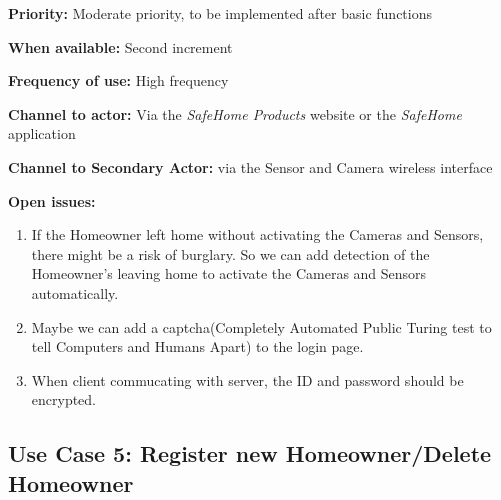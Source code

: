 \documentclass[twoside,11pt]{article}
\begin{document}
\begin{center}
{{\begin{multicols}{2}
                \textbf{Priority:} Moderate priority, to be implemented after basic functions

                \textbf{When available:} Second increment

                \textbf{Frequency of use:} High frequency

                \textbf{Channel to actor:} Via the \emph{SafeHome Products} website or the \emph{SafeHome} application

                \textbf{Channel to Secondary Actor:} via the Sensor and Camera wireless interface

                \textbf{Open issues:}

                \begin{enumerate}
                    \item If the Homeowner left home without activating the Cameras and Sensors, there might be a risk of burglary. So we can add detection of the Homeowner's leaving home to activate the Cameras and Sensors automatically.
                    \item Maybe we can add a captcha(Completely Automated Public Turing test to tell Computers and Humans Apart) to the login page.
                    \item When client commucating with server, the ID and password should be encrypted.
                \end{enumerate}

            \end{multicols}}}
\end{center}

\newpage

\subsection{Use Case 5: Register new Homeowner/Delete Homeowner}
\end{document}
